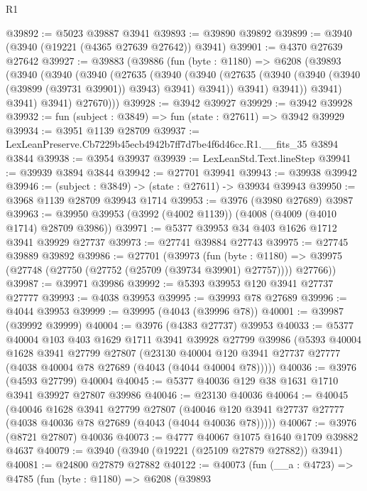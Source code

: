 \begin{lexlean}{R1}
\begin{coremodule}
@39892 := @5023 @39887 @3941
@39893 := @39890 @39892
@39899 := @3940 (@3940 (@19221 (@4365 @27639 @27642)) @3941)
@39901 := @4370 @27639 @27642
@39927 := @39883
    (@39886
      (fun (byte : @1180) =>
      @6208
        (@39893
          (@3940
            (@3940
              (@3940
                (@27635
                  (@3940
                    (@3940
                      (@27635 (@3940 (@3940 (@3940 (@39899 (@39731 @39901)) @3943) @3941) @3941))
                      @3941)
                    @3941))
                @3941)
              @3941)
            @3941)
          @27670)))
@39928 := @3942 @39927
@39929 := @3942 @39928
@39932 := fun (subject : @3849) => fun (state : @27611) => @3942 @39929
@39934 := @3951 @1139 @28709
@39937 := LexLeanPreserve.Cb7229b45ecb4942b7ff7d7be4f6d46cc.R1.__fits_35 @3894 @3844
@39938 := @3954 @39937
@39939 := LexLeanStd.Text.lineStep
@39941 := @39939 @3894 @3844
@39942 := @27701 @39941
@39943 := @39938 @39942
@39946 := (subject : @3849) -> (state : @27611) -> @39934 @39943
@39950 := @3968 @1139 @28709 @39943 @1714
@39953 := @3976 (@3980 @27689) @3987
@39963 := @39950 @39953 (@3992 (@4002 @1139)) (@4008 (@4009 (@4010 @1714) @28709 @3986))
@39971 := @5377 @39953 @34 @403 @1626 @1712 @3941 @39929 @27737
@39973 := @27741 @39884 @27743
@39975 := @27745 @39889 @39892
@39986 := @27701
    (@39973
      (fun (byte : @1180) =>
      @39975 (@27748 (@27750 (@27752 (@25709 (@39734 @39901) @27757)))) @27766))
@39987 := @39971 @39986
@39992 := @5393 @39953 @120 @3941 @27737 @27777
@39993 := @4038 @39953
@39995 := @39993 @78 @27689
@39996 := @4044 @39953
@39999 := @39995 (@4043 (@39996 @78))
@40001 := @39987 (@39992 @39999)
@40004 := @3976 (@4383 @27737) @39953
@40033 := @5377
    @40004
    @103
    @403
    @1629
    @1711
    @3941
    @39928
    @27799
    @39986
    (@5393
      @40004
      @1628
      @3941
      @27799
      @27807
      (@23130 @40004 @120 @3941 @27737 @27777 (@4038 @40004 @78 @27689 (@4043 (@4044 @40004 @78)))))
@40036 := @3976 (@4593 @27799) @40004
@40045 := @5377 @40036 @129 @38 @1631 @1710 @3941 @39927 @27807 @39986
@40046 := @23130 @40036
@40064 := @40045
    (@40046
      @1628
      @3941
      @27799
      @27807
      (@40046 @120 @3941 @27737 @27777 (@4038 @40036 @78 @27689 (@4043 (@4044 @40036 @78)))))
@40067 := @3976 (@8721 @27807) @40036
@40073 := @4777 @40067 @1075 @1640 @1709 @39882 @4637
@40079 := @3940 (@3940 (@19221 (@25109 @27879 @27882)) @3941)
@40081 := @24800 @27879 @27882
@40122 := @40073
    (fun (__a : @4723) =>
    @4785
      (fun (byte : @1180) =>
      @6208
        (@39893

\end{coremodule}
\end{lexlean}
